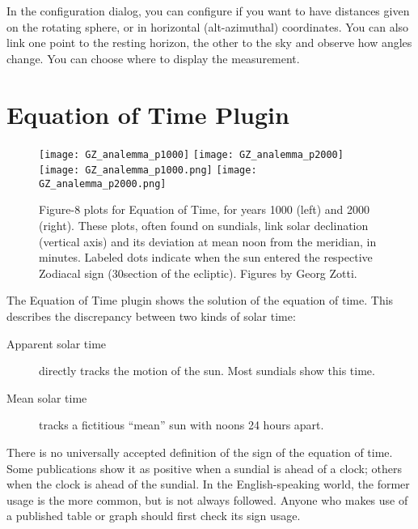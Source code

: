 \noindent In the configuration dialog, you can configure if you want to have
distances given on the rotating sphere, or in horizontal
(alt-azimuthal) coordinates. You can also link one point to the
resting horizon, the other to the sky and observe how angles change.
You can choose where to display the measurement.

\newpage
\section{Equation of Time Plugin}
\label{sec:plugins:EquationOfTime}


\begin{figure}[h]\centering
\ifpdf
\texttt{[image: GZ\_analemma\_p1000]}
\texttt{[image: GZ\_analemma\_p2000]}
\else
\texttt{[image: GZ\_analemma\_p1000.png]}
\texttt{[image: GZ\_analemma\_p2000.png]}
\fi
\caption{Figure-8 plots for Equation of Time, for years 1000 (left)
  and 2000 (right). These plots, often found on sundials, link solar
  declination (vertical axis) and its deviation at mean noon from the
  meridian, in minutes. Labeled dots indicate when the sun entered the
  respective Zodiacal sign (30\degree section of the
  ecliptic). Figures by Georg Zotti.}
\label{fig:EqOfTime}
\end{figure}


\noindent The Equation of Time plugin shows the solution of the equation of time. %
This describes the discrepancy between two kinds of
solar time:
\begin{description}
\item[Apparent solar time] directly tracks the motion of the sun. Most sundials show this time.
\item[Mean solar time] tracks a fictitious ``mean'' sun with noons 24 hours apart. 
\end{description}

There is no universally accepted definition of the sign of the
equation of time. Some publications show it as positive when a sundial
is ahead of a clock; others when the clock is ahead of the sundial. In
the English-speaking world, the former usage is the more common, but
is not always followed. Anyone who makes use of a published table or
graph should first check its sign usage.

